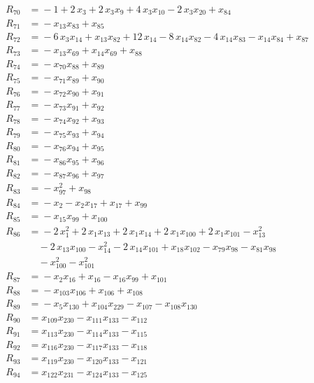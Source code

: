 \begin{align*}
R_{70} &={} -1 +2\,x_{3} +2\,x_{3} x_{9} +4\,x_{3} x_{10} -2\,x_{3} x_{20} +x_{84} \\[2pt]
R_{71} &={} -x_{13} x_{83} +x_{85} \\[2pt]
R_{72} &={} -6\,x_{3} x_{14} +x_{13} x_{82} +12\,x_{14} -8\,x_{14} x_{82} -4\,x_{14} x_{83} -x_{14} x_{84} +x_{87} \\[2pt]
R_{73} &={} -x_{13} x_{69} +x_{14} x_{69} +x_{88} \\[2pt]
R_{74} &={} -x_{70} x_{88} +x_{89} \\[2pt]
R_{75} &={} -x_{71} x_{89} +x_{90} \\[2pt]
R_{76} &={} -x_{72} x_{90} +x_{91} \\[2pt]
R_{77} &={} -x_{73} x_{91} +x_{92} \\[2pt]
R_{78} &={} -x_{74} x_{92} +x_{93} \\[2pt]
R_{79} &={} -x_{75} x_{93} +x_{94} \\[2pt]
R_{80} &={} -x_{76} x_{94} +x_{95} \\[2pt]
R_{81} &={} -x_{86} x_{95} +x_{96} \\[2pt]
R_{82} &={} -x_{87} x_{96} +x_{97} \\[2pt]
R_{83} &={} -x_{97}^{2} +x_{98} \\[2pt]
R_{84} &={} -x_{2} -x_{2} x_{17} +x_{17} +x_{99} \\[2pt]
R_{85} &={} -x_{15} x_{99} +x_{100} \\[2pt]
R_{86} &={} -2\,x_{1}^{2} +2\,x_{1} x_{13} +2\,x_{1} x_{14} +2\,x_{1} x_{100} +2\,x_{1} x_{101} -x_{13}^{2} \\
&\quad{} -2\,x_{13} x_{100} -x_{14}^{2} -2\,x_{14} x_{101} +x_{18} x_{102} -x_{79} x_{98} -x_{81} x_{98} \\
&\quad{} -x_{100}^{2} -x_{101}^{2} \\[2pt]
R_{87} &={} -x_{2} x_{16} +x_{16} -x_{16} x_{99} +x_{101} \\[2pt]
R_{88} &={} -x_{103} x_{106} +x_{106} +x_{108} \\[2pt]
R_{89} &={} -x_{5} x_{130} +x_{104} x_{229} -x_{107} -x_{108} x_{130} \\[2pt]
R_{90} &={} x_{109} x_{230} -x_{111} x_{133} -x_{112} \\[2pt]
R_{91} &={} x_{113} x_{230} -x_{114} x_{133} -x_{115} \\[2pt]
R_{92} &={} x_{116} x_{230} -x_{117} x_{133} -x_{118} \\[2pt]
R_{93} &={} x_{119} x_{230} -x_{120} x_{133} -x_{121} \\[2pt]
R_{94} &={} x_{122} x_{231} -x_{124} x_{133} -x_{125} \\[2pt]

\end{align*}
